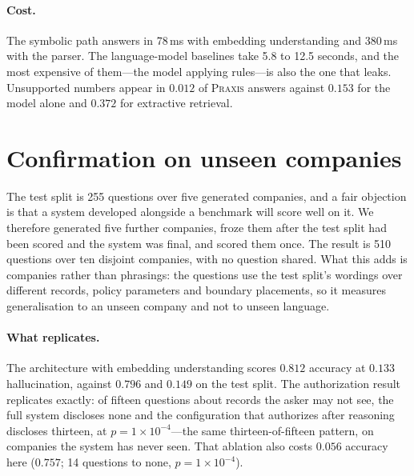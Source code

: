 \documentclass[11pt]{article}
\begin{document}
\paragraph{Cost.} The symbolic path answers in 78\,ms with embedding understanding and
380\,ms with the parser. The language-model baselines take 5.8 to 12.5 seconds, and the
most expensive of them---the model applying rules---is also the one that leaks. Unsupported
numbers appear in $0.012$ of \textsc{Praxis} answers against $0.153$ for the model alone
and $0.372$ for extractive retrieval.

\begin{table}[t]
\centering\small
{}
\caption{Test split. Rates with 95\% bootstrap intervals.}
\label{tab:main}
\end{table}

\section{Confirmation on unseen companies}\label{sec:confirm}
The test split is 255 questions over five generated companies, and a fair objection is
that a system developed alongside a benchmark will score well on it. We therefore
generated five further companies, froze them after the test split had been scored and the
system was final, and scored them once. The result is 510 questions over ten disjoint
companies, with no question shared. What this adds is companies rather than phrasings:
the questions use the test split's wordings over different records, policy parameters and
boundary placements, so it measures generalisation to an unseen company and not to unseen
language.

\paragraph{What replicates.} The architecture with embedding understanding scores $0.812$
accuracy at $0.133$ hallucination, against $0.796$ and $0.149$ on the test split. The
authorization result replicates exactly: of fifteen questions about records the asker may
not see, the full system discloses none and the configuration that authorizes after
reasoning discloses thirteen, at $p=1\times10^{-4}$---the same thirteen-of-fifteen
pattern, on companies the system has never seen. That ablation also costs $0.056$ accuracy
here ($0.757$; 14 questions to none, $p=1\times10^{-4}$).
\end{document}
